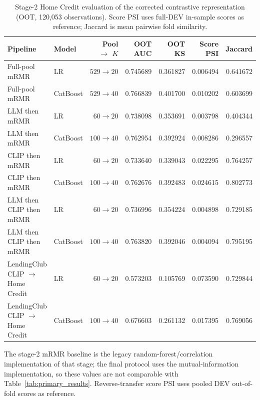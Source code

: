 \documentclass[preprint,12pt]{elsarticle}
\newcommand{\Kfeat}{K}
\begin{document}
\begin{table}
\centering
\footnotesize
\begin{threeparttable}
\caption{Stage-2 Home Credit evaluation of the corrected contrastive representation (OOT, 120,053 observations). Score PSI uses full-DEV in-sample scores as reference; Jaccard is mean pairwise fold similarity.}
\label{tab:clip_increment}
\begin{tabular}{@{}llrrrrr@{}}
\toprule
Pipeline & Model & Pool $\rightarrow$ $\Kfeat$ & OOT AUC & OOT KS & Score PSI & Jaccard \\
\midrule
Full-pool mRMR & LR & $529\rightarrow20$ & 0.745689 & 0.361827 & 0.006494 & 0.641672 \\
Full-pool mRMR & CatBoost & $529\rightarrow40$ & 0.766839 & 0.401700 & 0.010202 & 0.603699 \\
LLM then mRMR & LR & $60\rightarrow20$ & 0.738098 & 0.353691 & 0.003798 & 0.404344 \\
LLM then mRMR & CatBoost & $100\rightarrow40$ & 0.762954 & 0.392924 & 0.008286 & 0.296557 \\
CLIP then mRMR & LR & $60\rightarrow20$ & 0.733640 & 0.339043 & 0.022295 & 0.764257 \\
CLIP then mRMR & CatBoost & $100\rightarrow40$ & 0.762676 & 0.392483 & 0.024615 & 0.802773 \\
LLM then CLIP then mRMR & LR & $60\rightarrow20$ & 0.736996 & 0.354224 & 0.004898 & 0.729185 \\
LLM then CLIP then mRMR & CatBoost & $100\rightarrow40$ & 0.763820 & 0.392046 & 0.004094 & 0.795195 \\
LendingClub CLIP $\rightarrow$ Home Credit & LR & $60\rightarrow20$ & 0.573203 & 0.105769 & 0.073590 & 0.729844 \\
LendingClub CLIP $\rightarrow$ Home Credit & CatBoost & $100\rightarrow40$ & 0.676603 & 0.261132 & 0.017395 & 0.769056 \\
\bottomrule
\end{tabular}
\begin{tablenotes}\footnotesize
\item The stage-2 mRMR baseline is the legacy random-forest/correlation implementation of that stage; the final protocol uses the mutual-information implementation, so these values are not comparable with Table~\ref{tab:primary_results}. Reverse-transfer score PSI uses pooled DEV out-of-fold scores as reference.
\end{tablenotes}
\end{threeparttable}
\end{table}
\end{document}

